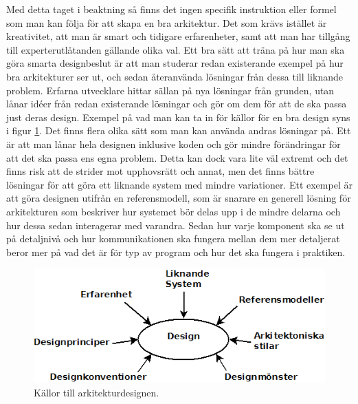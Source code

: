\newline
\newline
Med detta taget i beaktning så finns det ingen specifik instruktion eller formel som man kan följa för att skapa en bra arkitektur. Det som krävs istället är kreativitet, att man är smart och tidigare erfarenheter, samt att man har tillgång till experterutlåtanden gällande olika val.
\newline
\newline
Ett bra sätt att träna på hur man ska göra smarta designbeslut är att man studerar redan existerande exempel på hur bra arkitekturer ser ut, och sedan återanvända lösningar från dessa till liknande problem. Erfarna utvecklare hittar sällan på nya lösningar från grunden, utan lånar idéer från redan existerande lösningar och gör om dem för att de ska passa just deras design. Exempel på vad man kan ta in för källor för en bra design syns i figur \ref{fig:des}. \cite[s. 226--227]{set}
\newline
\newline
Det finns flera olika sätt som man kan använda andras lösningar på. Ett är att man lånar hela designen inklusive koden och gör mindre förändringar för att det ska passa ens egna problem. Detta kan dock vara lite väl extremt och det finns risk att de strider mot upphovsrätt och annat, men det finns bättre lösningar för att göra ett liknande system med mindre variationer. Ett exempel är att göra designen utifrån en referensmodell, som är snarare en generell lösning för arkitekturen som beskriver hur systemet bör delas upp i de mindre delarna och hur dessa sedan interagerar med varandra. Sedan hur varje komponent ska se ut på detaljnivå och hur kommunikationen ska fungera mellan dem mer detaljerat beror mer på vad det är för typ av program och hur det ska fungera i praktiken. \cite[s. 226--227]{set}

\begin{figure}[h]
\centerline{\includegraphics[scale=0.6]{sebastian-tex/grafik/designadviceny.png}}
\caption{Källor till arkitekturdesignen.}
\label{fig:des}
\end{figure}


